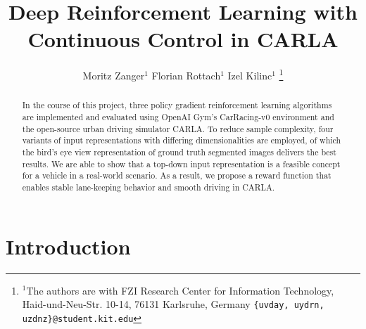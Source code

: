 \documentclass[letterpaper, 10 pt, conference]{ieeeconf}  %
\title{\LARGE \bf
Deep Reinforcement Learning with Continuous Control in CARLA
}
\author{Moritz Zanger$^{1}$ Florian Rottach$^{1}$ Izel Kilinc$^{1}$ %
\thanks{$^{1}$The authors are with FZI Research Center for Information Technology, Haid-und-Neu-Str. 10-14, 76131 Karlsruhe, Germany
        {\tt\small \{uvday, uydrn, uzdnz\}@student.kit.edu}}%
}
\begin{document}
\maketitle
\thispagestyle{empty}
\pagestyle{empty}


\begin{abstract}


In the course of this project, three policy gradient reinforcement learning algorithms are implemented and evaluated using OpenAI Gym's CarRacing-v0 environment and the open-source urban driving simulator CARLA. To reduce sample complexity, four variants of input representations with differing dimensionalities are employed, of which the bird's eye view representation of ground truth segmented images delivers the best results. We are able to show that a top-down input representation is a feasible concept for a vehicle in a real-world scenario. As a result, we propose a reward function that enables stable lane-keeping behavior and smooth driving in CARLA.
\end{abstract}


\section{Introduction}

\end{document}
